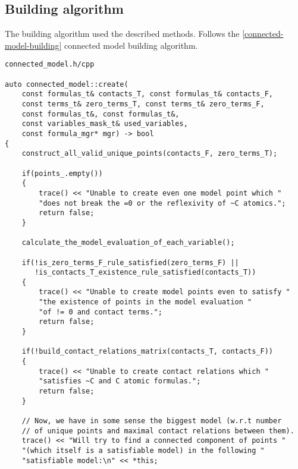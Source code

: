 \documentclass{article}
\begin{document}
	\subsection{Building algorithm}
	The building algorithm used the described methods. Follows the \ref{connected-model-building} connected model building algorithm.
\\
\begin{lstlisting}
connected_model.h/cpp

auto connected_model::create(
	const formulas_t& contacts_T, const formulas_t& contacts_F,
	const terms_t& zero_terms_T, const terms_t& zero_terms_F,
	const formulas_t&, const formulas_t&,
	const variables_mask_t& used_variables,
	const formula_mgr* mgr) -> bool
{
    construct_all_valid_unique_points(contacts_F, zero_terms_T);

    if(points_.empty())
    {
        trace() << "Unable to create even one model point which "
        "does not break the =0 or the reflexivity of ~C atomics.";
        return false;
    }

    calculate_the_model_evaluation_of_each_variable();

    if(!is_zero_terms_F_rule_satisfied(zero_terms_F) ||
       !is_contacts_T_existence_rule_satisfied(contacts_T))
    {
        trace() << "Unable to create model points even to satisfy "
        "the existence of points in the model evaluation "
        "of != 0 and contact terms.";
        return false;
    }

    if(!build_contact_relations_matrix(contacts_T, contacts_F))
    {
        trace() << "Unable to create contact relations which "
        "satisfies ~C and C atomic formulas.";
        return false;
    }

    // Now, we have in some sense the biggest model (w.r.t number
    // of unique points and maximal contact relations between them).
    trace() << "Will try to find a connected component of points "
    "(which itself is a satisfiable model) in the following "
    "satisfiable model:\n" << *this;
\end{lstlisting}
\newpage
\end{document}
